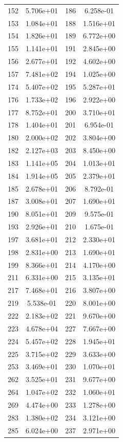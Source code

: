 \documentclass[12pt]{article}
\begin{document}
\begin{longtable}{@{}cccc@{}}
152 & 5.706e+01 & 186 & 6.258e-01 \\
153 & 1.084e+01 & 188 & 1.516e+01 \\
154 & 1.826e+01 & 189 & 6.772e+00 \\
155 & 1.141e+01 & 191 & 2.845e+00 \\
156 & 2.677e+01 & 192 & 4.602e+00 \\
157 & 7.481e+02 & 194 & 1.025e+00 \\
174 & 5.407e+02 & 195 & 5.287e+01 \\
176 & 1.733e+02 & 196 & 2.922e+00 \\
177 & 8.752e+01 & 200 & 3.710e+01 \\
178 & 1.404e+01 & 201 & 6.954e-01 \\
180 & 2.000e+02 & 202 & 3.804e+00 \\
182 & 2.127e+03 & 203 & 8.450e+00 \\
183 & 1.141e+05 & 204 & 1.013e+01 \\
184 & 1.914e+05 & 205 & 2.379e+01 \\
185 & 2.678e+01 & 206 & 8.792e-01 \\
187 & 3.008e+01 & 207 & 1.690e+01 \\
190 & 8.051e+01 & 209 & 9.575e-01 \\
193 & 2.926e+01 & 210 & 1.675e-01 \\
197 & 3.681e+01 & 212 & 2.330e+01 \\
198 & 2.831e+00 & 213 & 1.690e+01 \\
199 & 8.366e+01 & 214 & 4.170e+00 \\
211 & 6.331e+00 & 215 & 3.135e+01 \\
217 & 7.468e+01 & 216 & 3.807e+00 \\
219 & 5.538e-01 & 220 & 8.001e+00 \\
222 & 2.183e+02 & 221 & 9.670e+00 \\
223 & 4.678e+04 & 227 & 7.667e+00 \\
224 & 5.457e+02 & 228 & 1.945e+01 \\
225 & 3.715e+02 & 229 & 3.633e+00 \\
253 & 3.469e+01 & 230 & 1.070e+01 \\
262 & 3.525e+01 & 231 & 9.677e+00 \\
264 & 1.047e+02 & 232 & 1.060e+01 \\
269 & 4.474e+00 & 233 & 1.278e+00 \\
283 & 1.380e+02 & 234 & 3.121e+00 \\
285 & 6.024e+00 & 237 & 2.971e+00 \\

\end{longtable}
\end{document}
